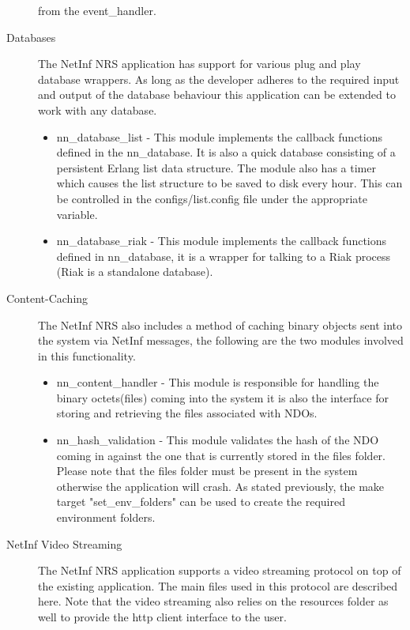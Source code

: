\begin{description}
\begin {itemize}
from the event\_handler.
\end{itemize}
\item[Databases]
The NetInf NRS application has support for various plug and play database wrappers. As long as the developer adheres to the required input and output of 
the database behaviour this application can be extended to work with any database. 
\begin{itemize}
\item nn\_database\_list - This module implements the callback functions defined in the nn\_database. It is also a quick database consisting of a persistent 
Erlang list data structure. The module also has a timer which causes the list structure to be saved to disk every hour. This can be controlled in the 
configs/list.config file under the appropriate variable.
\item nn\_database\_riak - This module implements the callback functions defined in nn\_database, it is a wrapper for talking to a Riak process (Riak is a standalone database).
\end{itemize}
\item[Content-Caching]
The NetInf NRS also includes a method of caching binary objects sent into the system via NetInf messages, the following are the two modules involved in this functionality.
\begin {itemize}
\item nn\_content\_handler - This module is responsible for handling the binary octets(files) coming into the system it is also the interface for 
storing and retrieving the files associated with NDOs.
\item nn\_hash\_validation - This module validates the hash of the NDO coming in against the one that is currently stored in the files folder. Please 
note that the files folder must be present in the system otherwise the application will crash. As stated previously, the make target "set\_env\_folders" 
can be used to create the required environment folders.
\end{itemize}
\item[NetInf Video Streaming]
The NetInf NRS application supports a video streaming protocol on top of the existing application. The main files used in this protocol are described here. 
Note that the video streaming also relies on the resources folder as well to provide the http client interface to the user. 


\end{description}

